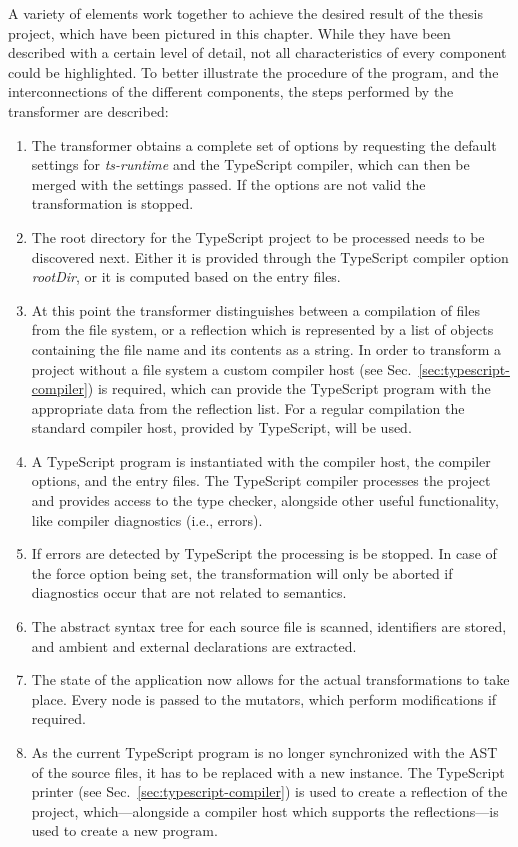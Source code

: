 A variety of elements work together to achieve the desired result of the thesis project, which have been pictured in this chapter. While they have been described with a certain level of detail, not all characteristics of every component could be highlighted. To better illustrate the procedure of the program, and the interconnections of the different components, the steps performed by the transformer are described:
\begin{enumerate}
  \item The transformer obtains a complete set of options by requesting the default settings for \emph{ts-runtime} and the TypeScript compiler, which can then be merged with the settings passed. If the options are not valid the transformation is stopped.
  \item The root directory for the TypeScript project to be processed needs to be discovered next. Either it is provided through the TypeScript compiler option \emph{rootDir}, or it is computed based on the entry files.
  \item At this point the transformer distinguishes between a compilation of files from the file system, or a reflection which is represented by a list of objects containing the file name and its contents as a string. In order to transform a project without a file system a custom compiler host (see Sec.~\ref{sec:typescript-compiler}) is required, which can provide the TypeScript program with the appropriate data from the reflection list. For a regular compilation the standard compiler host, provided by TypeScript, will be used.
  \item A TypeScript program is instantiated with the compiler host, the compiler options, and the entry files. The TypeScript compiler processes the project and provides access to the type checker, alongside other useful functionality, like compiler diagnostics (i.e., errors).
  \item If errors are detected by TypeScript the processing is be stopped. In case of the force option being set, the transformation will only be aborted if diagnostics occur that are not related to semantics.
  \item The abstract syntax tree for each source file is scanned, identifiers are stored, and ambient and external declarations are extracted.
  \item The state of the application now allows for the actual transformations to take place. Every node is passed to the mutators, which perform modifications if required.
  \item As the current TypeScript program is no longer synchronized with the AST of the source files, it has to be replaced with a new instance. The TypeScript printer (see Sec.~\ref{sec:typescript-compiler}) is used to create a reflection of the project, which---alongside a compiler host which supports the reflections---is used to create a new program.

\end{enumerate}
